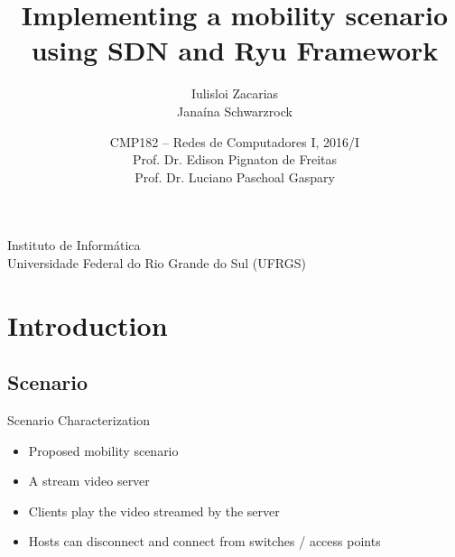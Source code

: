 \documentclass{beamer}
\begin{document}
\title
{Implementing a mobility scenario using SDN and Ryu Framework}


\author
{Iulisloi Zacarias \\ Janaína Schwarzrock}

\institute
{
  Instituto de Informática\\
  Universidade Federal do Rio Grande do Sul (UFRGS)
}

\date[CMP182]
{CMP182 – Redes de Computadores I, 2016/I \\
\scriptsize Prof. Dr. Edison Pignaton de Freitas \\
            Prof. Dr. Luciano Paschoal Gaspary}






\frame[plain]{\titlepage}


\section{Introduction}

\subsection{Scenario}

\begin{frame}{Scenario Characterization}
\begin{itemize}
  \item Proposed mobility scenario
  \item A stream video server
  \item Clients play the video streamed by the server
  \item Hosts can disconnect and connect from switches / access points 
\end{itemize}
\end{frame}
\end{document}
